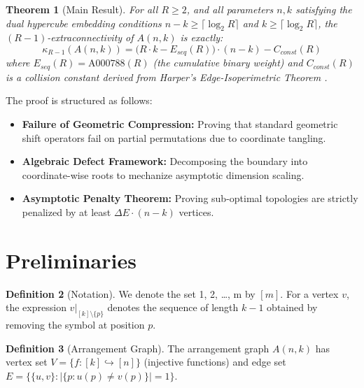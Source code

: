 \documentclass[11pt, letterpaper]{article}
\newtheorem{theorem}{Theorem}[section]
\theoremstyle{definition}
\newtheorem{definition}[theorem]{Definition}
\theoremstyle{remark}
\begin{document}
\begin{theorem}[Main Result]\label{them:main}
For all $R \ge 2$, and all parameters $n, k$ satisfying the dual hypercube embedding conditions $n-k \ge \lceil \log_2 R \rceil$ and $k \ge \lceil \log_2 R \rceil$, the $(R-1)$-extraconnectivity of $A(n,k)$ is exactly:
\begin{equation*}
\kappa_{R-1}(A(n,k)) = \big(R \cdot k - E_{seq}(R)\big) \cdot (n - k) - C_{const}(R)
\end{equation*} where $E_{seq}(R) = \text{A000788}(R)$ (the cumulative binary weight) and $C_{const}(R)$ is a collision constant derived from Harper's Edge-Isoperimetric Theorem \cite{harper1966optimal}.
\end{theorem}

The proof is structured as follows:
\begin{itemize}
    \item \textbf{Failure of Geometric Compression:} Proving that standard geometric shift operators fail on partial permutations due to coordinate tangling.
    \item \textbf{Algebraic Defect Framework:} Decomposing the boundary into coordinate-wise roots to mechanize asymptotic dimension scaling.
    \item \textbf{Asymptotic Penalty Theorem:} Proving sub-optimal topologies are strictly penalized by at least $\Delta E \cdot (n-k)$ vertices.
\end{itemize}

\section{Preliminaries}

\begin{definition}[Notation]
We denote the set {1, 2, \dots, m} by $[m]$. For a vertex $v$, the expression $v|_{[k]\setminus\{p\}}$ denotes the sequence of length $k-1$ obtained by removing the symbol at position $p$.
\end{definition}

\begin{definition}[Arrangement Graph]
The arrangement graph $A(n,k)$ has vertex set $V = \{ f : [k] \hookrightarrow [n] \}$ (injective functions) and edge set $E = \{ \{u, v\} : |\{p : u(p) \neq v(p)\}| = 1 \}$.
\end{definition}
\end{document}
